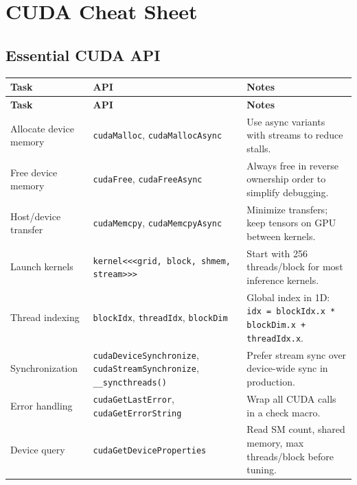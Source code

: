\documentclass[10pt, oneside, openany]{book}
\newcommand{\code}[1]{\texttt{#1}}
\begin{document}
\appendix

\chapter{CUDA Cheat Sheet}
\label{app:cuda}

\section*{Essential CUDA API}

\begin{longtable}{@{}p{3.8cm}p{4.8cm}p{4.5cm}@{}}
  \toprule
  \textbf{Task} & \textbf{API} & \textbf{Notes} \\
  \midrule
  \endfirsthead
  \toprule
  \textbf{Task} & \textbf{API} & \textbf{Notes} \\
  \midrule
  \endhead
  Allocate device memory & \code{cudaMalloc}, \code{cudaMallocAsync} & Use async variants with streams to reduce stalls. \\
  Free device memory & \code{cudaFree}, \code{cudaFreeAsync} & Always free in reverse ownership order to simplify debugging. \\
  Host/device transfer & \code{cudaMemcpy}, \code{cudaMemcpyAsync} & Minimize transfers; keep tensors on GPU between kernels. \\
  Launch kernels & \code{kernel<<<grid, block, shmem, stream>>>} & Start with 256 threads/block for most inference kernels. \\
  Thread indexing & \code{blockIdx}, \code{threadIdx}, \code{blockDim} & Global index in 1D: \code{idx = blockIdx.x * blockDim.x + threadIdx.x}. \\
  Synchronization & \code{cudaDeviceSynchronize}, \code{cudaStreamSynchronize}, \code{\_\_syncthreads()} & Prefer stream sync over device-wide sync in production. \\
  Error handling & \code{cudaGetLastError}, \code{cudaGetErrorString} & Wrap all CUDA calls in a check macro. \\
  Device query & \code{cudaGetDeviceProperties} & Read SM count, shared memory, max threads/block before tuning. \\
  \bottomrule
\end{longtable}
\end{document}
